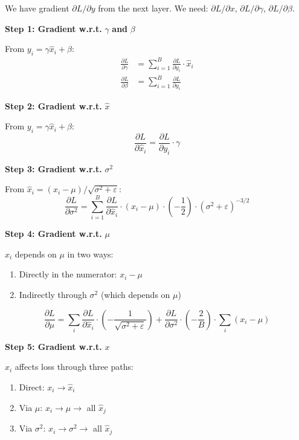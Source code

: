 \documentclass[11pt,oneside]{book}
\begin{document}
We have gradient $\partial L/\partial y$ from the next layer. We need: $\partial L/\partial x$, $\partial L/\partial \gamma$, $\partial L/\partial \beta$.

\textbf{Step 1: Gradient w.r.t.} $\gamma$ \textbf{and} $\beta$

From $y_i = \gamma \hat{x}_i + \beta$:
\begin{align*}
\frac{\partial L}{\partial \gamma} &= \sum_{i=1}^B \frac{\partial L}{\partial y_i} \cdot \hat{x}_i \\
\frac{\partial L}{\partial \beta} &= \sum_{i=1}^B \frac{\partial L}{\partial y_i}
\end{align*}

\textbf{Step 2: Gradient w.r.t.} $\hat{x}$

From $y_i = \gamma \hat{x}_i + \beta$:
\[
\frac{\partial L}{\partial \hat{x}_i} = \frac{\partial L}{\partial y_i} \cdot \gamma
\]

\textbf{Step 3: Gradient w.r.t.} $\sigma^2$

From $\hat{x}_i = (x_i - \mu) / \sqrt{\sigma^2 + \varepsilon}$:
\[
\frac{\partial L}{\partial \sigma^2} = \sum_{i=1}^B \frac{\partial L}{\partial \hat{x}_i} \cdot (x_i - \mu) \cdot \left(-\frac{1}{2}\right) \cdot (\sigma^2 + \varepsilon)^{-3/2}
\]

\textbf{Step 4: Gradient w.r.t.} $\mu$

$\hat{x}_i$ depends on $\mu$ in two ways:
\begin{enumerate}
\item Directly in the numerator: $x_i - \mu$
\item Indirectly through $\sigma^2$ (which depends on $\mu$)
\end{enumerate}

\[
\frac{\partial L}{\partial \mu} = \sum_i \frac{\partial L}{\partial \hat{x}_i} \cdot \left(-\frac{1}{\sqrt{\sigma^2 + \varepsilon}}\right) + \frac{\partial L}{\partial \sigma^2} \cdot \left(-\frac{2}{B}\right) \cdot \sum_i (x_i - \mu)
\]

\textbf{Step 5: Gradient w.r.t.} $x$

$x_i$ affects loss through three paths:
\begin{enumerate}
\item Direct: $x_i \to \hat{x}_i$
\item Via $\mu$: $x_i \to \mu \to$ all $\hat{x}_j$
\item Via $\sigma^2$: $x_i \to \sigma^2 \to$ all $\hat{x}_j$
\end{enumerate}
\end{document}
